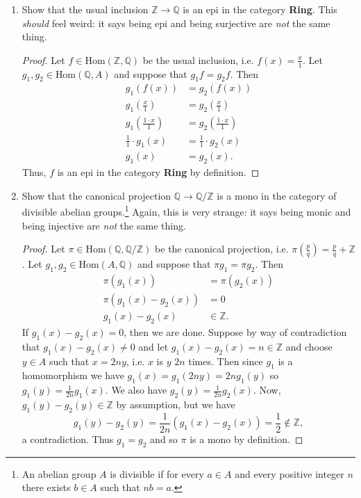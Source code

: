 \documentclass[11pt,oneside,english]{amsart}
\theoremstyle{definition}
\newcommand{\MB}[1]{\mathbb{#1}}
\newcommand{\Hom}{\text{Hom}}
\begin{document}
\begin{enumerate}[leftmargin=*]
\begin{enumerate}
\item Show that the usual inclusion $\mathbb{Z} \longrightarrow \mathbb{Q}$ is an epi in the category {\bf Ring}. This \textit{should} feel weird: it says being epi and being surjective are \textit{not} the same thing.

\begin{proof}
Let $f\in\Hom(\MB{Z},\MB{Q})$ be the usual inclusion, i.e. $f(x)=\frac{x}{1}$. Let $g_1,g_2\in\Hom(\MB{Q},A)$ and suppose that $g_1f=g_2f$. Then 
\begin{align*}
g_1(f(x))&=g_2(f(x))\\[2mm]
g_1\left(\frac{x}{1}\right)&=g_2\left(\frac{x}{1}\right)\\[2mm]
g_1\left(\frac{1\cdot x}{1}\right)&=g_2\left(\frac{1\cdot x}{1}\right)\\[2mm]
\frac{1}{1}\cdot g_1(x)&=\frac{1}{1}\cdot g_2(x)\\[2mm]
g_1(x)&=g_2(x).
\end{align*}
Thus, $f$ is an epi in the category \textbf{Ring} by definition.
\end{proof}

\pagebreak

\item Show that the canonical projection $\mathbb{Q} \longrightarrow \mathbb{Q}/\MB{Z}$ is a mono in the category of divisible abelian groups.\footnote{An abelian group $A$ is divisible if for every $a \in A$ and every positive integer $n$ there exists $b \in A$ such that $nb = a$.} Again, this is very strange: it says being monic and being injective are \textit{not} the same thing. 

\begin{proof}
Let $\pi\in\Hom(\MB{Q},\MB{Q}/\MB{Z})$ be the canonical projection, i.e. $\pi\left(\frac{p}{q}\right)=\frac{p}{q}+\MB{Z}$. Let $g_1,g_2\in \Hom(A,\MB{Q})$ and suppose that $\pi g_1=\pi g_2$. Then
\begin{align*}
\pi(g_1(x))&=\pi(g_2(x))\\
\pi(g_1(x)-g_2(x))&=0\\
g_1(x)-g_2(x)&\in\MB{Z}.
\end{align*}
If $g_1(x)-g_2(x)=0$, then we are done. Suppose by way of contradiction that $g_1(x)-g_2(x)\neq0$ and let $g_1(x)-g_2(x)=n\in\MB{Z}$ and choose $y\in A$ such that $x=2ny$, i.e. $x$ is $y$ $2n$ times. Then since $g_1$ is a homomorphism we have $g_1(x)=g_1(2ny)=2ng_1(y)$ so $g_1(y)=\frac{1}{2n}g_1(x)$. We also have $g_2(y)=\frac{1}{2n}g_2(x)$. Now, $g_1(y)-g_2(y)\in \MB{Z}$ by assumption, but we have
\[
g_1(y)-g_2(y)=\frac{1}{2n}(g_1(x)-g_2(x))=\frac{1}{2}\notin\MB{Z},
\]
a contradiction. Thus $g_1=g_2$ and so $\pi$ is a mono by definition.
\end{proof}
\end{enumerate}


\end{enumerate}
\end{document}
